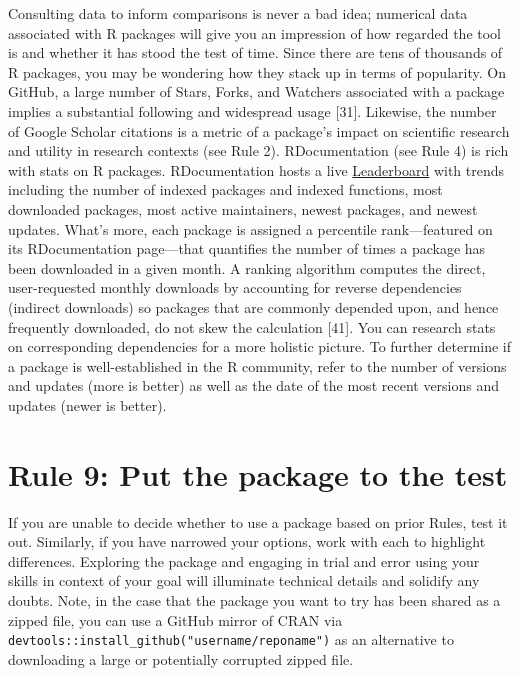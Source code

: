 \documentclass[10pt,letterpaper]{article}
\begin{document}
Consulting data to inform comparisons is never a bad idea; numerical
data associated with R packages will give you an impression of how
regarded the tool is and whether it has stood the test of time. Since
there are tens of thousands of R packages, you may be wondering how they
stack up in terms of popularity. On GitHub, a large number of Stars,
Forks, and Watchers associated with a package implies a substantial
following and widespread usage {[}31{]}. Likewise, the number of Google
Scholar citations is a metric of a package's impact on scientific
research and utility in research contexts (see Rule 2). RDocumentation
(see Rule 4) is rich with stats on R packages. RDocumentation hosts a
live \href{https://www.rdocumentation.org/trends}{Leaderboard} with
trends including the number of indexed packages and indexed functions,
most downloaded packages, most active maintainers, newest packages, and
newest updates. What's more, each package is assigned a percentile
rank---featured on its RDocumentation page---that quantifies the number
of times a package has been downloaded in a given month. A ranking
algorithm computes the direct, user-requested monthly downloads by
accounting for reverse dependencies (indirect downloads) so packages
that are commonly depended upon, and hence frequently downloaded, do not
skew the calculation {[}41{]}. You can research stats on corresponding
dependencies for a more holistic picture. To further determine if a
package is well-established in the R community, refer to the number of
versions and updates (more is better) as well as the date of the most
recent versions and updates (newer is better).

\hypertarget{rule-9-put-the-package-to-the-test}{%
\section{Rule 9: Put the package to the
test}\label{rule-9-put-the-package-to-the-test}}

If you are unable to decide whether to use a package based on prior
Rules, test it out. Similarly, if you have narrowed your options, work
with each to highlight differences. Exploring the package and engaging
in trial and error using your skills in context of your goal will
illuminate technical details and solidify any doubts. Note, in the case
that the package you want to try has been shared as a zipped file, you
can use a GitHub mirror of CRAN via
\texttt{devtools::install\_github("username/reponame")} as an
alternative to downloading a large or potentially corrupted zipped file.
\end{document}
